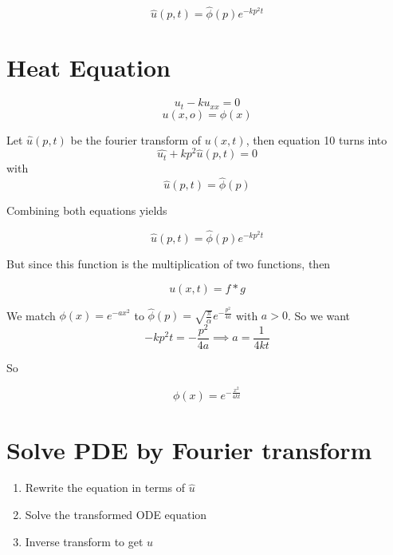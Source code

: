 \documentclass{article}
\newtheorem{one minute paper}[theorem]{One Minute Paper}
\begin{document}
\begin{equation}
    \widehat{u}(p,t) = \widehat{\phi}(p)e^{-kp^2t}
\end{equation}

\section*{Heat Equation}

\begin{equation}
    u_t - ku_{xx} = 0
\end{equation}
\begin{equation}
    u(x,o) = \phi(x)
\end{equation}

Let $\widehat{u}(p,t)$ be the fourier transform of $u(x,t)$, then equation 10 turns into
\begin{equation}
    \widehat{u_t} + kp^2\widehat{u}(p,t) = 0
\end{equation}
with
\begin{equation}
    \widehat{u}(p,t) = \widehat{\phi}(p)
\end{equation}

Combining both equations yields

\begin{equation}
    \widehat{u}(p,t) = \widehat{\phi}(p)e^{-kp^2t}
\end{equation}

But since this function is the multiplication of two functions, then 

\begin{equation}
    u(x,t) = f \ast g
\end{equation}

We match $\phi(x) = e^{-ax^2}$ to $\widehat{\phi}(p) = \sqrt{\frac{\pi}{\alpha}}e^{-\frac{p^2}{4a}}$ with $a > 0$. So we want 
\begin{equation}
    -kp^2t = -\frac{p^2}{4a} \implies a = \frac{1}{4kt}
\end{equation}

So 

\begin{equation}
    \phi(x) = e^{-\frac{x^2}{4kt}}
\end{equation}

\section*{Solve PDE by Fourier transform}

\begin{enumerate}
    \item Rewrite the equation in terms of $\widehat{u}$
    \item Solve the transformed ODE equation
    \item Inverse transform to get $u$
\end{enumerate}
\end{document}
